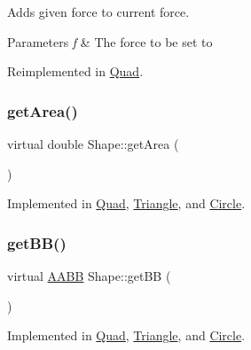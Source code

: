Adds given force to current force. 


\begin{DoxyParams}{Parameters}
{\em f} & The force to be set to \\
\hline
\end{DoxyParams}


Reimplemented in \mbox{\hyperlink{class_quad_a1f0a30842d8b35a8402baa8bb76384ad}{Quad}}.

\mbox{\label{class_shape_acec2178598665e96b85f1ac6a13a47b9}} 
\subsubsection{\texorpdfstring{getArea()}{getArea()}}
{\footnotesize\ttfamily virtual double Shape\+::get\+Area (\begin{DoxyParamCaption}{ }\end{DoxyParamCaption})\hspace{0.3cm}{\ttfamily [pure virtual]}}



Implemented in \mbox{\hyperlink{class_quad_abd7230629190e09ee3bdadefb6784320}{Quad}}, \mbox{\hyperlink{class_triangle_a19b449e6969b9288e189ced41c3aca40}{Triangle}}, and \mbox{\hyperlink{class_circle_a99fe1cbabbf3a9ccae51832376c5e8d4}{Circle}}.

\mbox{\label{class_shape_a2490226328b30c113a7f07e2edda5f94}} 
\subsubsection{\texorpdfstring{getBB()}{getBB()}}
{\footnotesize\ttfamily virtual \mbox{\hyperlink{class_a_a_b_b}{A\+A\+BB}} Shape\+::get\+BB (\begin{DoxyParamCaption}{ }\end{DoxyParamCaption})\hspace{0.3cm}{\ttfamily [pure virtual]}}



Implemented in \mbox{\hyperlink{class_quad_a8b7be43a01fb3263d36b0eb2f5961ccd}{Quad}}, \mbox{\hyperlink{class_triangle_a6f8c4358b9aa4de071618729547f4fd5}{Triangle}}, and \mbox{\hyperlink{class_circle_a7df161b9fa0dce04ed01f7924658faf3}{Circle}}.

\mbox{\label{class_shape_a01d3424af378ac4e8c423c57ccf836d1}} 
